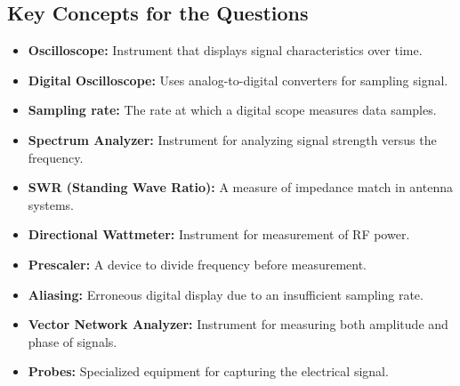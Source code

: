 \subsection*{Key Concepts for the Questions}
\begin{itemize}
    \item \textbf{Oscilloscope:} Instrument that displays signal characteristics over time.
     \item \textbf{Digital Oscilloscope:}  Uses analog-to-digital converters for sampling signal.
        \item \textbf{Sampling rate:} The rate at which a digital scope measures data samples.
        \item \textbf{Spectrum Analyzer:} Instrument for analyzing signal strength versus the frequency.
         \item \textbf{SWR (Standing Wave Ratio):} A measure of impedance match in antenna systems.
      \item \textbf{Directional Wattmeter:} Instrument for measurement of RF power.
       \item \textbf{Prescaler:} A device to divide frequency before measurement.
         \item  \textbf{Aliasing:} Erroneous digital display due to an insufficient sampling rate.
    \item \textbf{Vector Network Analyzer:} Instrument for measuring both amplitude and phase of signals.
         \item \textbf{Probes:} Specialized equipment for capturing the electrical signal.
\end{itemize}
